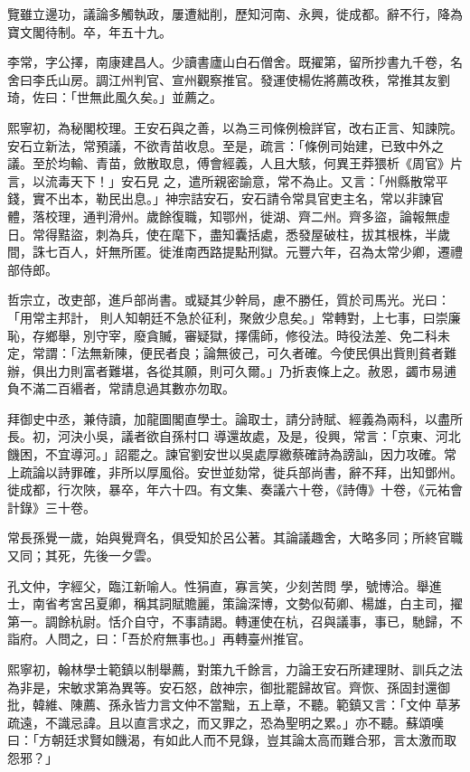 \begin{pinyinscope}
 覽雖立邊功，議論多觸執政，屢遭絀削，歷知河南、永興，徙成都。辭不行，降為寶文閣待制。卒，年五十九。



 李常，字公擇，南康建昌人。少讀書廬山白石僧舍。既擢第，留所抄書九千卷，名舍曰李氏山房。調江州判官、宣州觀察推官。發運使楊佐將薦改秩，常推其友劉琦，佐曰：「世無此風久矣。」並薦之。



 熙寧初，為秘閣校理。王安石與之善，以為三司條例檢詳官，改右正言、知諫院。安石立新法，常預議，不欲青苗收息。至是，疏言：「條例司始建，已致中外之議。至於均輸、青苗，斂散取息，傅會經義，人且大駭，何異王莽猥析《周官》片言，以流毒天下！」安石見
 之，遣所親密諭意，常不為止。又言：「州縣散常平錢，實不出本，勒民出息。」神宗詰安石，安石請令常具官吏主名，常以非諫官體，落校理，通判滑州。歲餘復職，知鄂州，徙湖、齊二州。齊多盜，論報無虛日。常得黠盜，刺為兵，使在麾下，盡知囊括處，悉發屋破柱，拔其根株，半歲間，誅七百人，奸無所匿。徙淮南西路提點刑獄。元豐六年，召為太常少卿，遷禮部侍郎。



 哲宗立，改吏部，進戶部尚書。或疑其少幹局，慮不勝任，質於司馬光。光曰：「用常主邦計，
 則人知朝廷不急於征利，聚斂少息矣。」常轉對，上七事，曰崇廉恥，存鄉舉，別守宰，廢貪贓，審疑獄，擇儒師，修役法。時役法差、免二科未定，常謂：「法無新陳，便民者良；論無彼己，可久者確。今使民俱出貲則貧者難辦，俱出力則富者難堪，各從其願，則可久爾。」乃折衷條上之。赦恩，蠲市易逋負不滿二百緡者，常請息過其數亦勿取。



 拜御史中丞，兼侍讀，加龍圖閣直學士。論取士，請分詩賦、經義為兩科，以盡所長。初，河決小吳，議者欲自孫村口
 導還故處，及是，役興，常言：「京東、河北饑困，不宜導河。」詔罷之。諫官劉安世以吳處厚繳蔡確詩為謗訕，因力攻確。常上疏論以詩罪確，非所以厚風俗。安世並劾常，徙兵部尚書，辭不拜，出知鄧州。徙成都，行次陜，暴卒，年六十四。有文集、奏議六十卷，《詩傳》十卷，《元祐會計錄》三十卷。



 常長孫覺一歲，始與覺齊名，俱受知於呂公著。其論議趣舍，大略多同；所終官職又同；其死，先後一夕雲。



 孔文仲，字經父，臨江新喻人。性狷直，寡言笑，少刻苦問
 學，號博洽。舉進士，南省考宮呂夏卿，稱其詞賦贍麗，策論深博，文勢似荀卿、楊雄，白主司，擢第一。調餘杭尉。恬介自守，不事請謁。轉運使在杭，召與議事，事已，馳歸，不詣府。人問之，曰：「吾於府無事也。」再轉臺州推官。



 熙寧初，翰林學士範鎮以制舉薦，對策九千餘言，力論王安石所建理財、訓兵之法為非是，宋敏求第為異等。安石怒，啟神宗，御批罷歸故官。齊恢、孫固封還御批，韓維、陳薦、孫永皆力言文仲不當黜，五上章，不聽。範鎮又言：「文仲
 草茅疏遠，不識忌諱。且以直言求之，而又罪之，恐為聖明之累。」亦不聽。蘇頌嘆曰：「方朝廷求賢如饑渴，有如此人而不見錄，豈其論太高而難合邪，言太激而取怨邪？」




\end{pinyinscope}
